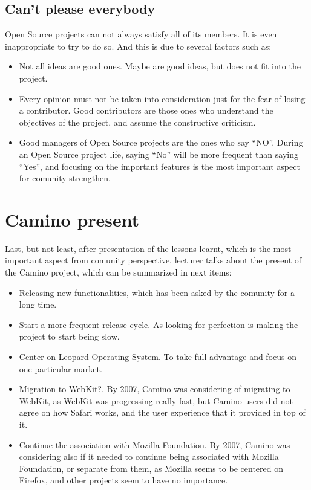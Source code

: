 \documentclass[11pt]{article}
\begin{document}
\subsection{Can't please everybody}
Open Source projects can not always satisfy all of its members. It is even inappropriate to try to do so. And this is due to several factors such as:
\begin{itemize}\itemsep0pt
\item{Not all ideas are good ones}. Maybe are good ideas, but does not fit into the project.
\item{Every opinion must not be taken into consideration just for the fear of losing a contributor}. Good contributors are those ones who understand the objectives of the project, and assume the constructive criticism.
\item{Good managers of Open Source projects are the ones who say ``NO''}. During an Open Source project life, saying ``No'' will be more frequent than saying ``Yes'', and focusing on the important features is the most important aspect for comunity strengthen.
\end{itemize}

\section{Camino present}
Last, but not least, after presentation of the lessons learnt, which is the most important aspect from comunity perspective, lecturer talks about the present of the Camino project, which can be summarized in next items:
\begin{itemize}\itemsep0pt
\item{Releasing new functionalities}, which has been asked by the comunity for a long time.
\item{Start a more frequent release cycle}. As looking for perfection is making the project to start being slow.
\item{Center on Leopard Operating System}. To take full advantage and focus on one particular market.
\item{Migration to WebKit?}. By 2007, Camino was considering of migrating to WebKit, as WebKit was progressing really fast, but Camino users did not agree on how Safari works, and the user experience that it provided in top of it.
\item{Continue the association with Mozilla Foundation}. By 2007, Camino was considering also if it needed to continue being associated with Mozilla Foundation, or separate from them, as Mozilla seems to be centered on Firefox, and other projects seem to have no importance.
\end{itemize}
\end{document}
